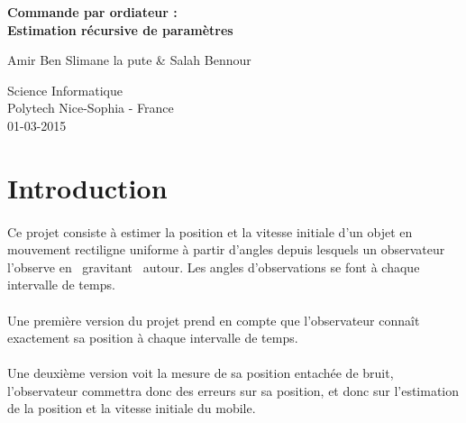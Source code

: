 \documentclass[a4paper,11pt]{article}
\begin{document}
\begin{titlepage}
    \begin{center}
        \vspace*{1cm}
        
       	\vfill
       	\Huge
        \textbf{Commande par ordiateur :\\ Estimation récursive de paramètres}

        \vspace{0.3cm}
        \Large
		Amir Ben Slimane la pute \& Salah Bennour         
        

		\vfill
        \vspace{0.8cm}
        

        \Large
        Science Informatique\\
        Polytech Nice-Sophia - France\\
        01-03-2015
        
    \end{center}
\end{titlepage}

	\newpage

	\tableofcontents

	\newpage

	\section{Introduction}

		\paragraph{}
		Ce projet consiste à estimer la position et la vitesse initiale d'un objet en mouvement rectiligne uniforme à partir d'angles depuis lesquels un observateur l'observe en \« gravitant \» autour.
		Les angles d'observations se font à chaque intervalle de temps. 

		\paragraph{}
		Une première version du projet prend en compte que l'observateur connaît exactement sa position à chaque intervalle de temps. 

		\paragraph{}
		Une deuxième version voit la mesure de sa position entachée de bruit, l'observateur commettra donc des erreurs sur sa position, et donc sur l'estimation de la position et la vitesse initiale du mobile.
	
\end{document}
